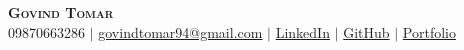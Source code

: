 \documentclass[letterpaper,11pt]{article}
\makeatletter
\newcommand{\resumeItem}[1]{
\item\small{
{#1 \vspace{-2pt}}
  }
}
\newcommand{\resumeSubheading}[4]{
  \vspace{-2pt}\item
    \begin{tabular*}{0.97\textwidth}[t]{l@{\extracolsep{\fill}}r}
      \textbf{#1} & #2 \\
      \textit{\small#3} & \textit{\small #4} \\
    \end{tabular*}\vspace{-7pt}
}
\newcommand{\resumeEducationHeading}[6]{
  \vspace{-2pt}\item
    \begin{tabular*}{0.97\textwidth}[t]{l@{\extracolsep{\fill}}r}
      \textbf{#1} & #2 \\
      \textit{\small#3} & \textit{\small #4} \\
      \textit{\small#5} & \textit{\small #6} \\
    \end{tabular*}\vspace{-5pt}
}
\newcommand{\resumeSubHeadingListStart}{\begin{itemize}[leftmargin=0.15in, label={}]}
\newcommand{\resumeSubHeadingListEnd}{\end{itemize}}
\newcommand{\resumeItemListStart}{\begin{itemize}}
\newcommand{\resumeItemListEnd}{\end{itemize}\vspace{-5pt}}
\makeatother
\begin{document}

\begin{center}
    \textbf{\Huge \scshape Govind Tomar} \\ \vspace{3pt}
    \small
    \faMobile \hspace{.5pt} {09870663286}
    $|$
    \faAt \hspace{.5pt} \href{mailto:govindtomar94@gmail.com}{govindtomar94@gmail.com}
    $|$
    \faLinkedinSquare \hspace{.5pt} \href{linkedin.com/govindtomar}{LinkedIn}
    $|$
    \faGithub \hspace{.5pt} \href{github.com/govindtomar}{GitHub}
    $|$
    \faGlobe \hspace{.5pt} \href{govindtomar.io}{Portfolio}
\end{center}





  







  

\end{document}
